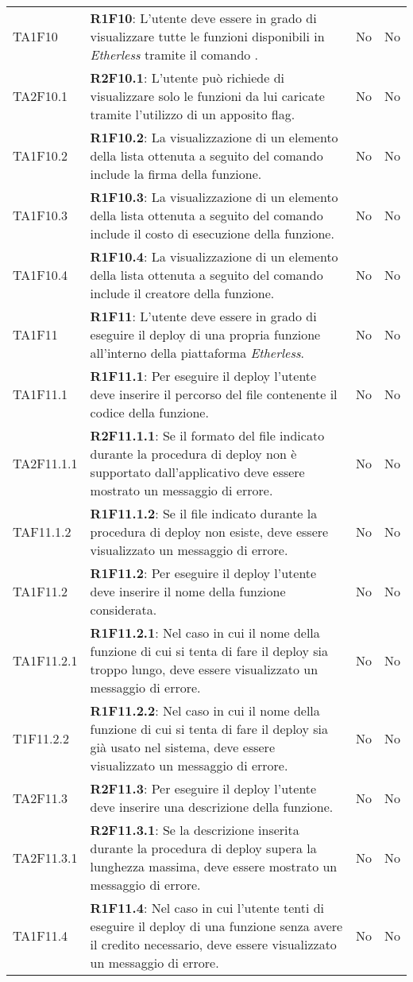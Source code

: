 \begin{longtable}{
		>{\centering}p{} 
		>{}p{}
		>{\centering}p{}
		>{\centering}p{} }
	TA1F10 		& \textbf{R1F10}: L'utente deve essere in grado di visualizzare tutte le funzioni disponibili in \textit{Etherless} tramite il comando \lista{}. 										& No & No \tabularnewline
	TA2F10.1 	& \textbf{R2F10.1}: L'utente può richiede di visualizzare solo le funzioni da lui caricate tramite l'utilizzo di un apposito flag.															& No & No \tabularnewline
	TA1F10.2 	& \textbf{R1F10.2}: La visualizzazione di un elemento della lista ottenuta a seguito del comando \lista{} include la firma della funzione. 												& No & No \tabularnewline
	TA1F10.3 	& \textbf{R1F10.3}: La visualizzazione di un elemento della lista ottenuta a seguito del comando \lista{} include il costo di esecuzione della funzione. 									& No & No \tabularnewline
	TA1F10.4		& \textbf{R1F10.4}: La visualizzazione di un elemento della lista ottenuta a seguito del comando \lista{} include il creatore della funzione. 												& No & No \tabularnewline

	TA1F11 		& \textbf{R1F11}: L'utente deve essere in grado di eseguire il deploy\ped{\textit{G}} di una propria funzione all'interno della piattaforma \textit{Etherless}. 							& No & No \tabularnewline
	TA1F11.1 	& \textbf{R1F11.1}: Per eseguire il deploy\ped{\textit{G}} l'utente deve inserire il percorso del file contenente il codice della funzione. 												& No & No \tabularnewline
	TA2F11.1.1 	& \textbf{R2F11.1.1}: Se il formato del file indicato durante la procedura di deploy\ped{\textit{G}} non è supportato dall'applicativo deve essere mostrato un messaggio di errore.			& No & No \tabularnewline
	TAF11.1.2 	& \textbf{R1F11.1.2}: Se il file indicato durante la procedura di deploy\ped{\textit{G}} non esiste, deve essere visualizzato un messaggio di errore.										& No & No \tabularnewline
	TA1F11.2 	& \textbf{R1F11.2}: Per eseguire il deploy\ped{\textit{G}} l'utente deve inserire il nome della funzione considerata. 																		& No & No \tabularnewline
	TA1F11.2.1 	& \textbf{R1F11.2.1}: Nel caso in cui il nome della funzione di cui si tenta di fare il deploy\ped{\textit{G}} sia troppo lungo, deve essere visualizzato un messaggio di errore. 			& No & No \tabularnewline
	T1F11.2.2 	& \textbf{R1F11.2.2}: Nel caso in cui il nome della funzione di cui si tenta di fare il deploy\ped{\textit{G}} sia già usato nel sistema, deve essere visualizzato un messaggio di errore.	& No & No \tabularnewline
	TA2F11.3 	& \textbf{R2F11.3}: Per eseguire il deploy\ped{\textit{G}} l'utente deve inserire una descrizione della funzione. 																			& No & No \tabularnewline
	TA2F11.3.1 	& \textbf{R2F11.3.1}: Se la descrizione inserita durante la procedura di deploy\ped{\textit{G}} supera la lunghezza massima, deve essere mostrato un messaggio di errore. 					& No & No \tabularnewline
	TA1F11.4 	& \textbf{R1F11.4}: Nel caso in cui l'utente tenti di eseguire il deploy\ped{\textit{G}} di una funzione senza avere il credito necessario, deve essere visualizzato un messaggio di errore. & No & No \tabularnewline


\end{longtable}
